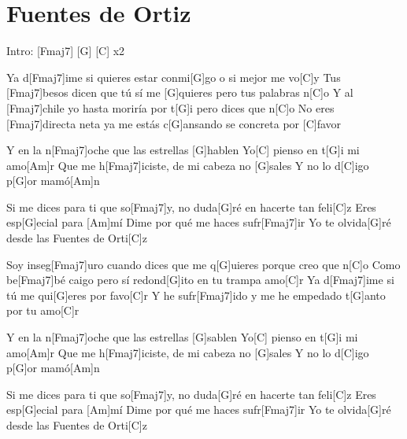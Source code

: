 \section{Fuentes de Ortiz}


\vspace{1cm}

\begin{guitar}

	\begin{multicols}{2}
	
		Intro: \hspace{0.5cm} [Fmaj7] \hspace{0.5cm}[G] \hspace{0.5cm} [C] \hspace{0.3cm} x2
		
		\newline
	
		Ya d[Fmaj7]ime si quieres estar 
		conmi[G]go o si mejor me vo[C]y
		Tus [Fmaj7]besos dicen que tú sí 
		me [G]quieres pero tus palabras n[C]o
		Y al [Fmaj7]chile yo hasta moriría 
		por t[G]i pero dices que n[C]o
		No eres [Fmaj7]directa neta ya me 
		estás c[G]ansando se concreta por [C]favor
		
		\newline
		Y en la n[Fmaj7]oche que las estrellas [G]hablen 
		Yo[C] pienso en t[G]i mi amo[Am]r
		Que me h[Fmaj7]iciste, de mi cabeza no [G]sales
		Y no lo d[C]igo p[G]or mamó[Am]n
		
		Si me dices para ti que so[Fmaj7]y, no duda[G]ré en hacerte tan feli[C]z
		Eres esp[G]ecial para [Am]mí
		Dime por qué me haces sufr[Fmaj7]ir
		Yo te olvida[G]ré desde las Fuentes de Orti[C]z
		
		\newline
		Soy inseg[Fmaj7]uro cuando dices que 
		me q[G]uieres porque creo que n[C]o
		Como be[Fmaj7]bé caigo pero sí 
		redond[G]ito en tu trampa amo[C]r
		Ya d[Fmaj7]ime si tú 
		me qui[G]eres por favo[C]r
		Y he sufr[Fmaj7]ido y me he 
		empedado t[G]anto por tu amo[C]r
		
		\newline
		Y en la n[Fmaj7]oche que las estrellas [G]sablen 
		Yo[C] pienso en t[G]i mi amo[Am]r
		Que me h[Fmaj7]iciste, de mi cabeza no [G]sales
		Y no lo d[C]igo p[G]or mamó[Am]n
		
		Si me dices para ti que so[Fmaj7]y, no duda[G]ré en hacerte tan feli[C]z
		Eres esp[G]ecial para [Am]mí
		Dime por qué me haces sufr[Fmaj7]ir
		Yo te olvida[G]ré desde las Fuentes de Orti[C]z
		

\end{multicols}
\end{guitar}

